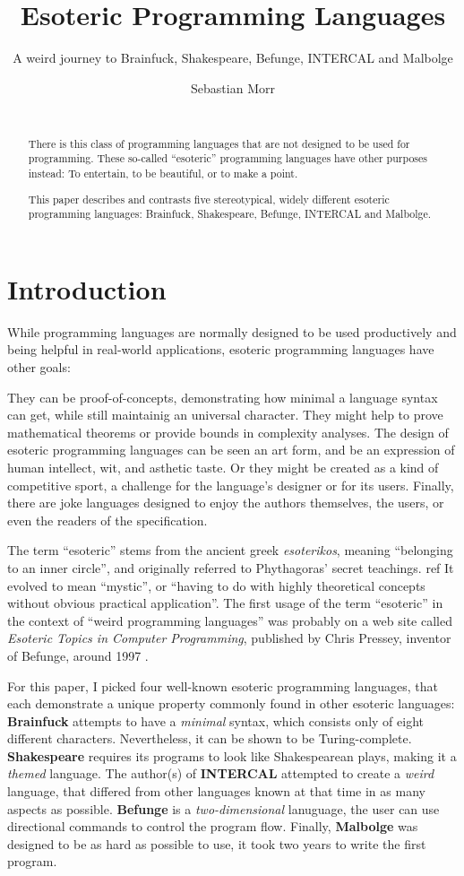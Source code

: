 \documentclass{sig-alternate}
\title{Esoteric Programming Languages}
\subtitle{A weird journey to Brainfuck, Shakespeare, Befunge, INTERCAL and Malbolge}
\author{\alignauthor Sebastian Morr\\\affaddr{Technical University Braunschweig, Germany}\\\email{sebastian@morr.cc}}
\begin{document}
\maketitle

\begin{abstract}
    There is this class of programming languages that are not designed to be used for programming. These so-called “esoteric” programming languages have other purposes instead: To entertain, to be beautiful, or to make a point.

    This paper describes and contrasts five stereotypical, widely different esoteric programming languages: Brainfuck, Shakespeare, Befunge, INTERCAL and Malbolge.
\end{abstract}

\section{Introduction}

While programming languages are normally designed to be used productively and being helpful in real-world applications, esoteric programming languages have other goals:

They can be proof-of-concepts, demonstrating how minimal a language syntax can get, while still maintainig an universal character. They might help to prove mathematical theorems or provide bounds in complexity analyses. The design of esoteric programming languages can be seen an art form, and be an expression of human intellect, wit, and asthetic taste. Or they might be created as a kind of competitive sport, a challenge for the language's designer or for its users. Finally, there are joke languages designed to enjoy the authors themselves, the users, or even the readers of the specification.

The term “esoteric” stems from the ancient greek \emph{esoterikos}, meaning “belonging to an inner circle”, and originally referred to Phythagoras' secret teachings. ref It evolved to mean “mystic”, or “having to do with highly theoretical concepts without obvious practical application”. The first usage of the term “esoteric” in the context of “weird programming languages” was probably on a web site called \emph{Esoteric Topics in Computer Programming}, published by Chris Pressey, inventor of Befunge, around 1997 \cite{pressey2005chris}.

For this paper, I picked four well-known esoteric programming languages, that each demonstrate a unique property commonly found in other esoteric languages: \textbf{Brainfuck} attempts to have a \textit{minimal} syntax, which consists only of eight different characters. Nevertheless, it can be shown to be Turing-complete. \textbf{Shakespeare} requires its programs to look like Shakespearean plays, making it a \textit{themed} language. The author(s) of \textbf{INTERCAL} attempted to create a \textit{weird} language, that differed from other languages known at that time in as many aspects as possible. \textbf{Befunge} is a \textit{two-dimensional} lanuguage, the user can use directional commands to control the program flow. Finally, \textbf{Malbolge} was designed to be as hard as possible to use, it took two years to write the first program.
\end{document}
